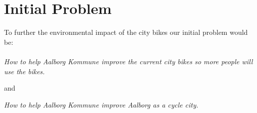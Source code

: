 \section*{Initial Problem}
To further the environmental impact of the city bikes our initial problem would be:\\\\
\textit{How to help Aalborg Kommune improve the current city bikes so more people will use the bikes.} 
\begin{center}
and
\end{center}
\textit{How to help Aalborg Kommune improve Aalborg as a cycle city.}